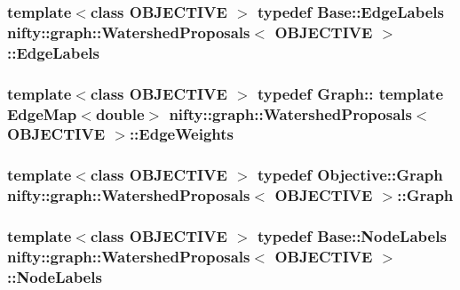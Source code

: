 \subsubsection[{Edge\+Labels}]{\setlength{\rightskip}{0pt plus 5cm}template$<$class O\+B\+J\+E\+C\+T\+I\+V\+E $>$ typedef {\bf Base\+::\+Edge\+Labels} {\bf nifty\+::graph\+::\+Watershed\+Proposals}$<$ O\+B\+J\+E\+C\+T\+I\+V\+E $>$\+::{\bf Edge\+Labels}}\label{classnifty_1_1graph_1_1WatershedProposals_a193558ab36f22b02bd769212a3369304}
\hypertarget{classnifty_1_1graph_1_1WatershedProposals_adfde03fd0d46304ec23018bde36cfe87}{}
\subsubsection[{Edge\+Weights}]{\setlength{\rightskip}{0pt plus 5cm}template$<$class O\+B\+J\+E\+C\+T\+I\+V\+E $>$ typedef Graph\+:: template Edge\+Map$<$double$>$ {\bf nifty\+::graph\+::\+Watershed\+Proposals}$<$ O\+B\+J\+E\+C\+T\+I\+V\+E $>$\+::{\bf Edge\+Weights}}\label{classnifty_1_1graph_1_1WatershedProposals_adfde03fd0d46304ec23018bde36cfe87}
\hypertarget{classnifty_1_1graph_1_1WatershedProposals_ac1b4debb35285dc3e993460a4d579ebb}{}
\subsubsection[{Graph}]{\setlength{\rightskip}{0pt plus 5cm}template$<$class O\+B\+J\+E\+C\+T\+I\+V\+E $>$ typedef Objective\+::\+Graph {\bf nifty\+::graph\+::\+Watershed\+Proposals}$<$ O\+B\+J\+E\+C\+T\+I\+V\+E $>$\+::{\bf Graph}}\label{classnifty_1_1graph_1_1WatershedProposals_ac1b4debb35285dc3e993460a4d579ebb}
\hypertarget{classnifty_1_1graph_1_1WatershedProposals_aaf3781be9f0ca924072375a681149673}{}
\subsubsection[{Node\+Labels}]{\setlength{\rightskip}{0pt plus 5cm}template$<$class O\+B\+J\+E\+C\+T\+I\+V\+E $>$ typedef {\bf Base\+::\+Node\+Labels} {\bf nifty\+::graph\+::\+Watershed\+Proposals}$<$ O\+B\+J\+E\+C\+T\+I\+V\+E $>$\+::{\bf Node\+Labels}}\label{classnifty_1_1graph_1_1WatershedProposals_aaf3781be9f0ca924072375a681149673}
\hypertarget{classnifty_1_1graph_1_1WatershedProposals_a6c8b1e69ffce69a32dc4a1a5fdd8b455}{}
